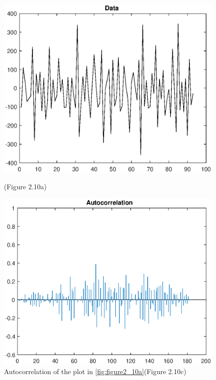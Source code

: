 \documentclass[11pt,a4paper]{article}
\begin{document}
\begin{figure}[ht]
	\centering
	\begin{minipage}{0.45\textwidth}
		\centering
		\includegraphics[width=\textwidth]{ex1fig2_10a}
		\caption{(Figure 2.10a)}
		\label{fig:figure2_10a}
	\end{minipage}
	\begin{minipage}{0.45\textwidth}
		\centering
		\includegraphics[width=\textwidth]{ex1fig2_10c}
		\caption{Autocorrelation of the plot in \autoref{fig:figure2_10a}(Figure 2.10c)}
		\label{fig:figure2_10c}
	\end{minipage}
\end{figure}
\end{document}

